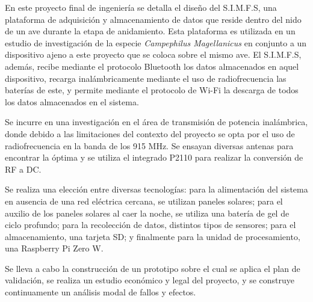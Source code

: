 

En este proyecto final de ingeniería se detalla el diseño del S.I.M.F.S, una plataforma de adquisición y almacenamiento de datos que reside dentro del nido de un ave durante la etapa de anidamiento. Esta plataforma es utilizada en un estudio de investigación de la especie \textit{Campephilus Magellanicus} en conjunto a un dispositivo ajeno a este proyecto que se coloca sobre el mismo ave. El S.I.M.F.S, además, recibe mediante el protocolo Bluetooth los datos almacenados en aquel dispositivo, recarga inalámbricamente mediante el uso de radiofrecuencia las baterías de este, y permite mediante el protocolo de Wi-Fi la descarga de todos los datos almacenados en el sistema. 

Se incurre en una investigación en el área de transmisión de potencia inalámbrica, donde debido a las limitaciones del contexto del proyecto se opta por el uso de radiofrecuencia en la banda de los 915 MHz. Se ensayan diversas antenas para encontrar la óptima y se utiliza el integrado P2110 para realizar la conversión de RF a DC.

Se realiza una elección entre diversas tecnologías: para la alimentación del sistema en ausencia de una red eléctrica cercana, se utilizan paneles solares; para el auxilio de los paneles solares al caer la noche, se utiliza una batería de gel de ciclo profundo; para la recolección de datos, distintos tipos de sensores; para el almacenamiento, una tarjeta SD; y finalmente para la unidad de procesamiento, una Raspberry Pi Zero W.

Se lleva a cabo la construcción de un prototipo sobre el cual se aplica el plan de validación, se realiza un estudio económico y legal del proyecto, y se construye continuamente un análisis modal de fallos y efectos.





%

